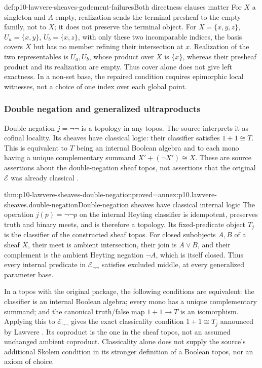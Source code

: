 \begin{hbexample}{def:p10-lawvere-sheaves-godement-failures}{Both directness clauses matter}
For \(X\) a singleton and \(A\) empty, realization sends the
terminal presheaf to the empty family, not to \(X\); it does
not preserve the terminal object.  For
\(X=\{x,y,z\}\), \(U_a=\{x,y\}\),
\(U_b=\{x,z\}\), with only these two incomparable indices,
the basis covers \(X\) but has no member refining their
intersection at \(x\).  Realization of the two representables
is \(U_a,U_b\), whose product over \(X\) is \(\{x\}\),
whereas their presheaf product and its realization are empty.
Thus cover alone does not give left exactness.  In a non-set base,
the repaired condition requires epimorphic local witnesses, not
a choice of one index over each global point.
\end{hbexample}

\subsubsection{Double negation and generalized ultraproducts}

Double negation \(j=\neg\neg\) is a topology in any topos.  The
source interprets it as cofinal locality.  Its sheaves have classical
logic: their classifier satisfies \(1+1\cong T\).  This is
equivalent to \(T\) being an internal Boolean algebra and to
each mono having a unique complementary summand
\(X'+(\neg X')\cong X\).  These are source assertions about
the double-negation sheaf topos, not assertions that the original
\(\mathcal E\) was already classical
\cite[p.~332]{Lawvere1970}.

\begin{hbtheorem}{thm:p10-lawvere-sheaves-double-negation}{proved=annex:p10.lawvere-sheaves.double-negation}{Double-negation sheaves have classical internal logic}
The operation \(j(p)=\neg\neg p\) on the internal Heyting
classifier is idempotent, preserves truth and binary meets, and
is therefore a topology.  Its fixed-predicate object \(T_j\)
is the classifier of the constructed sheaf topos.  For closed
subobjects \(A,B\) of a sheaf \(X\), their meet is ambient
intersection, their join is \(\overline{A\lor B}\), and
their complement is the ambient Heyting negation \(\neg A\),
which is itself closed.  Thus every internal predicate in
\(\mathcal E_{\neg\neg}\) satisfies excluded middle,
at every generalized parameter base.

In a topos with the original package, the following conditions
are equivalent: the classifier is an internal Boolean algebra;
every mono has a unique complementary summand; and the canonical
truth/false map \(1+1\to T\) is an isomorphism.  Applying
this to \(\mathcal E_{\neg\neg}\) gives the exact classicality
condition \(1+1\cong T_j\) announced by Lawvere
\cite[p.~332]{Lawvere1970}.  Its coproduct is the one in the
sheaf topos, not an assumed unchanged ambient coproduct.
Classicality alone does not supply the source's additional
Skolem condition in its stronger definition of a Boolean topos,
nor an axiom of choice.
\end{hbtheorem}

